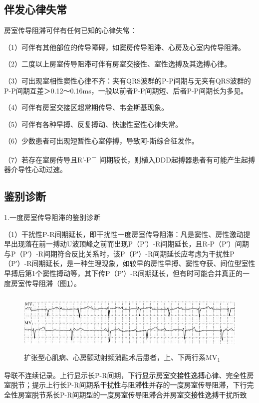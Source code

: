 \protect\hypertarget{text00027.htmlux5cux23subid329}{}{}

\subsection{伴发心律失常}

房室传导阻滞可伴有任何已知的心律失常：

（1）可伴有其他部位的传导障碍，如窦房传导阻滞、心房及心室内传导阻滞。

（2）二度以上房室传导阻滞可伴有房室交接性、室性逸搏及其逸搏心律。

（3）可出现室相性窦性心律不齐：夹有QRS波群的P-P间期与无夹有QRS波群的P-P间期互差＞0.12～0.16ms，一般以前者P-P间期短、后者P-P间期长为多见。

（4）可伴有房室交接区超常期传导、韦金斯基现象。

（5）可伴有各种早搏、反复搏动、快速性室性心律失常。

（6）少数患者可出现短暂性心室停搏，导致阿-斯综合征发作。

（7）若存在室房传导且R′-P\textsuperscript{－}
间期较长，则植入DDD起搏器患者有可能产生起搏器介导性心动过速。

\protect\hypertarget{text00027.htmlux5cux23subid330}{}{}

\subsection{鉴别诊断}

1.一度房室传导阻滞的鉴别诊断

（1）干扰性P-R间期延长，即干扰性一度房室传导阻滞：凡是窦性、房性激动提早出现落在前一搏动U波顶峰之前而出现P（P′）-R间期延长，且R-P（P′）间期与P（P′）-R间期符合反比关系时，该P（P′）-R间期延长应考虑为干扰性P（P′）-R间期延长，是一种生理现象，如较早的房性早搏、窦性夺获、间位型室性早搏后第1个窦性搏动等，其下传P（P′）-R间期延长，但有时可能合并真正的一度房室传导阻滞（图\ref{fig20-13}）。

\begin{figure}[!htbp]
 \centering
 \includegraphics[width=5.58333in,height=1.14583in]{./images/Image00342.jpg}
 \captionsetup{justification=centering}
 \caption{扩张型心肌病、心房颤动射频消融术后患者，上、下两行系MV\textsubscript{1}}
 \label{fig20-13}
  \end{figure} 
导联不连续记录。上行显示长P-R间期，下行显示房室交接性逸搏心律、完全性房室脱节；提示上行长P-R间期系干扰性与阻滞性并存的一度房室传导阻滞，下行完全性房室脱节系长P-R间期型的一度房室传导阻滞合并房室交接性逸搏干扰所致

